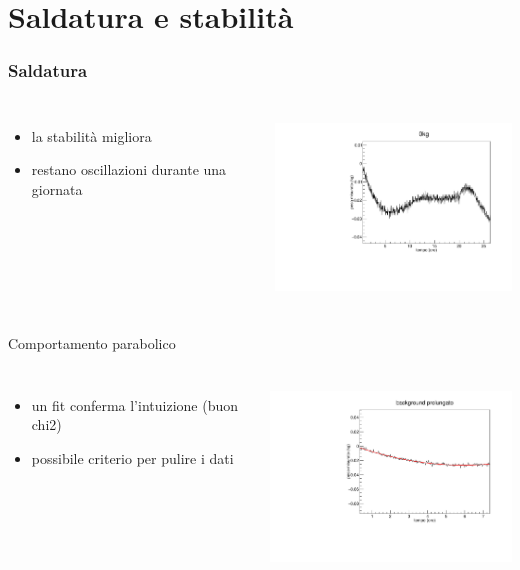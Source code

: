 \documentclass{beamer}
\begin{document}
\section{Saldatura e stabilit\`a}
\begin{frame}
  \frametitle{Saldatura}
  \begin{columns}[c] 
      \begin{itemize}
        \item la stabilit\`a migliora
        \item restano oscillazioni durante una giornata
      \end{itemize}
      \includegraphics[height=5cm]{../../analisi_dati/background/0kg_24h}   
   \end{columns}
\end{frame}
\begin{frame}{Comportamento parabolico}
  \begin{columns}[c] 
      \begin{itemize}
        \item un fit conferma l'intuizione (buon chi2)
        \item possibile criterio per pulire i dati
      \end{itemize}
      \includegraphics[height=5cm]{../../analisi_dati/background/0kg_parabola}   
   \end{columns}
\end{frame}
\end{document}
